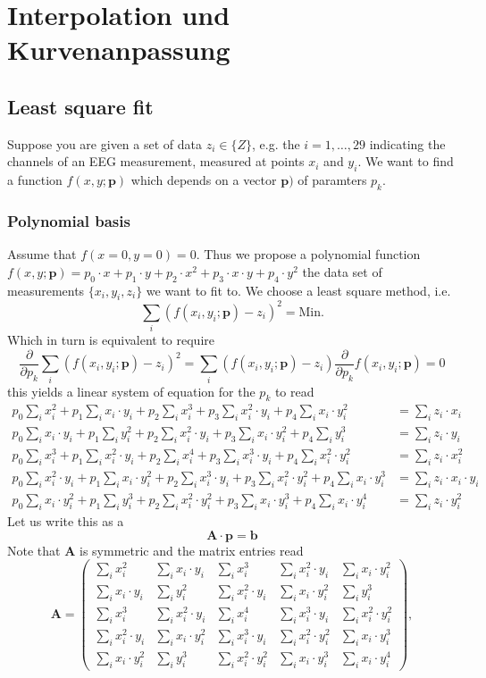 \chapter{Interpolation und Kurvenanpassung\label{chap:Fit}}

\section{Least square fit}
Suppose you are given a set of data $z_i\in\{Z\}$, e.g. the $i=1,\dots,29$ indicating the channels of an EEG measurement, measured at points $x_i$ and $y_i$. We want to find a function $f(x,y;\mathbf{p})$ which depends on a vector $\mathbf{p})$ of paramters $p_k$. 
\subsection{Polynomial basis}
Assume that $f(x=0,y=0)=0$. Thus we propose a polynomial function $f(x,y;\mathbf{p})=p_0\cdot x+p_1\cdot y+p_2\cdot x^2+p_3\cdot x\cdot y+p_4\cdot y^2$ the data set of measurements $\{x_i,y_i,z_i\}$ we want to fit to. We choose a least square method, i.e.
\[
\sum_i \left( f(x_i,y_i;\mathbf{p})-z_i\right)^2 = \text{Min}.
\]
Which in turn is equivalent to require
\[
\frac{\partial}{\partial p_k}\sum_i \left( f(x_i,y_i;\mathbf{p})-z_i\right)^2=\sum_i \left( f(x_i,y_i;\mathbf{p})-z_i\right)\frac{\partial}{\partial p_k}f(x_i,y_i;\mathbf{p})=0
\]
this yields a linear system of equation for the $p_k$ to read
\begin{align*}
p_0\sum_i x_i^2+p_1\sum_i x_i\cdot y_i+p_2\sum_i x_i^3+p_3\sum_i x_i^2\cdot y_i+p_4\sum_i x_i\cdot y_i^2&=\sum_iz_i\cdot x_i\\
p_0\sum_i x_i\cdot y_i+p_1\sum_i y_i^2+p_2\sum_i x_i^2\cdot y_i+p_3\sum_i x_i\cdot y_i^2+p_4\sum_i y_i^3&=\sum_iz_i\cdot y_i\\
p_0\sum_i x_i^3+p_1\sum_i x_i^2\cdot y_i+p_2\sum_i x_i^4+p_3\sum_i x_i^3\cdot y_i+p_4\sum_i x_i^2\cdot y_i^2&=\sum_iz_i\cdot x_i^2\\
p_0\sum_i x_i^2\cdot y_i+p_1\sum_i x_i\cdot y_i^2+p_2\sum_i x_i^3\cdot y_i+p_3\sum_i x_i^2\cdot y_i^2+p_4\sum_i x_i\cdot y_i^3&=\sum_iz_i\cdot x_i\cdot y_i\\
p_0\sum_i x_i\cdot y_i^2+p_1\sum_i y_i^3+p_2\sum_i x_i^2\cdot y_i^2+p_3\sum_i x_i\cdot y_i^3+p_4\sum_i x_i\cdot y_i^4&=\sum_iz_i\cdot y_i^2
\end{align*}
Let us write this as a 
\[
\mathbf{A}\cdot\mathbf{p}=\mathbf{b}
\]
Note that $\mathbf{A}$ is symmetric and the matrix entries read
\[ 
\mathbf{A}=
\begin{pmatrix}
\sum_i x_i^2&\sum_i x_i\cdot y_i&\sum_i x_i^3&\sum_i x_i^2\cdot y_i&\sum_i x_i\cdot y_i^2\\
\sum_i x_i\cdot y_i&\sum_i y_i^2&\sum_i x_i^2\cdot y_i&\sum_i x_i\cdot y_i^2&\sum_i y_i^3\\
\sum_i x_i^3&\sum_i x_i^2\cdot y_i&\sum_i x_i^4&\sum_i x_i^3\cdot y_i&\sum_i x_i^2\cdot y_i^2\\
\sum_i x_i^2\cdot y_i&\sum_i x_i\cdot y_i^2&\sum_i x_i^3\cdot y_i&\sum_i x_i^2\cdot y_i^2&\sum_i x_i\cdot y_i^3\\
\sum_i x_i\cdot y_i^2&\sum_i y_i^3&\sum_i x_i^2\cdot y_i^2&\sum_i x_i\cdot y_i^3&\sum_i x_i\cdot y_i^4
\end{pmatrix},
\]

